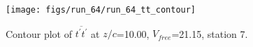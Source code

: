 \begin{figure}[H]
\centering
\texttt{[image: figs/run\_64/run\_64\_tt\_contour]}
\caption{Contour plot of $\overline{t^\prime t^\prime}$ at $z/c$=10.00, $V_{free}$=21.15, station 7.}
\label{fig:run_64_tt_contour}
\end{figure}


